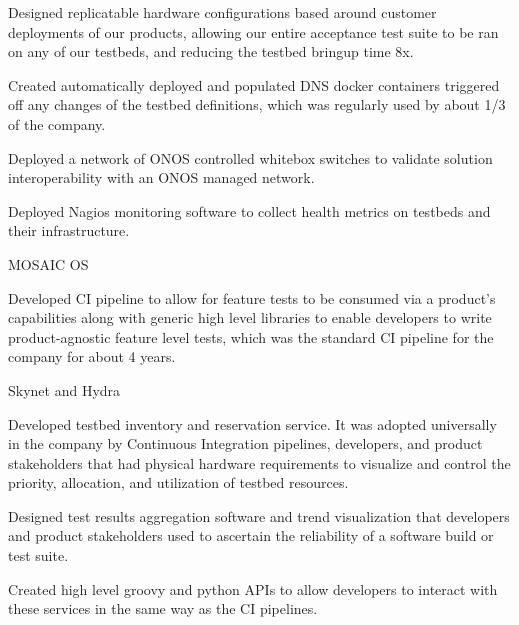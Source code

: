 \begin{cventries}
{\begin{cvitems}
        \item {Designed replicatable hardware configurations based around customer deployments of our products, allowing our entire acceptance test suite to be ran on any of our testbeds, and reducing the testbed bringup time 8x.}
        \item {Created automatically deployed and populated DNS docker containers triggered off any changes of the testbed definitions, which was regularly used by about 1/3 of the company.}
        \item {Deployed a network of ONOS controlled whitebox switches to validate solution interoperability with an ONOS managed network.}
        \item {Deployed Nagios monitoring software to collect health metrics on testbeds and their infrastructure.}
      \end{cvitems}
    }

  \cventry
    {} {MOSAIC OS} {} {} {
      \begin{cvitems}
        \item {Developed CI pipeline to allow for feature tests to be consumed via a product's capabilities along with generic high level libraries to enable developers to write product-agnostic feature level tests, which was the standard CI pipeline for the company for about 4 years.}
      \end{cvitems}
    }

  \cventry
    {} {Skynet and Hydra} {} {} {
      \begin{cvitems} %
        \item {Developed testbed inventory and reservation service. It was adopted universally in the company by Continuous Integration pipelines, developers, and product stakeholders that had physical hardware requirements to visualize and control the priority, allocation, and utilization of testbed resources.}
        \item {Designed test results aggregation software and trend visualization that developers and product stakeholders used to ascertain the reliability of a software build or test suite.}
        \item {Created high level groovy and python APIs to allow developers to interact with these services in the same way as the CI pipelines.}
      \end{cvitems}
    }

\end{cventries}
